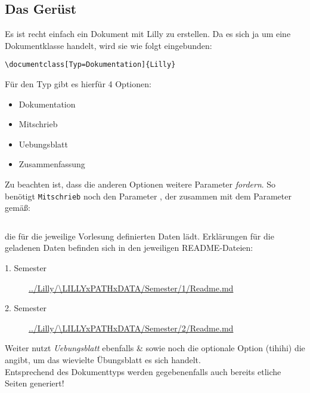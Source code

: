 \subsection{Das Gerüst}
Es ist recht einfach ein Dokument mit Lilly zu erstellen. Da es sich ja um eine Dokumentklasse handelt, wird sie wie folgt eingebunden:
\begin{lstlisting}[style=latex]
\documentclass[Typ=Dokumentation]{Lilly} 
\end{lstlisting}
Für den Typ gibt es hierfür 4 Optionen:
\begin{multicols}{2}
    \begin{itemize}[label=$\diamond$]\narrowitems
        \item Dokumentation
        \item Mitschrieb
        \item Uebungsblatt
        \item Zusammenfassung
    \end{itemize}
\end{multicols}
Zu beachten ist, dass die anderen Optionen weitere Parameter \emph{fordern}. \newline
So benötigt \verb|Mitschrieb| noch den Parameter , der zusammen mit dem Parameter  gemäß:
\begin{lstlisting}[style=latex,frame=none]

\end{lstlisting}
die für die jeweilige Vorlesung definierten Daten lädt.
Erklärungen für die geladenen Daten befinden sich in den jeweiligen README-Dateien:
\begin{description}
    \item[1. Semester] \url{../Lilly/\LILLYxPATHxDATA/Semester/1/Readme.md}
    \item[2. Semester] \url{../Lilly/\LILLYxPATHxDATA/Semester/2/Readme.md}
\end{description}


Weiter nutzt \emph{Uebungsblatt} ebenfalls \& sowie noch die optionale Option (tihihi)  die angibt, um das wievielte Übungsblatt es sich handelt. \\

Entsprechend des Dokumenttyps werden gegebenenfalls auch bereits etliche Seiten generiert!

